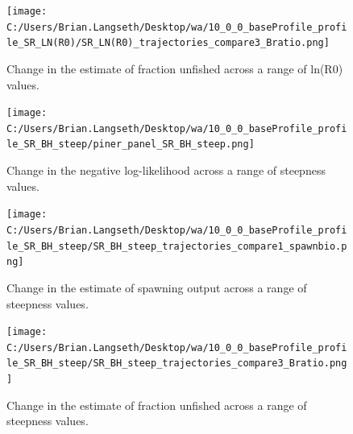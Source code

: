 \documentclass[11pt,
  english,
  letterpaper,
]{article}
\begin{document}

\begin{figure}
\centering
\texttt{[image: C:/Users/Brian.Langseth/Desktop/wa/10\_0\_0\_baseProfile\_profile\_SR\_LN(R0)/SR\_LN(R0)\_trajectories\_compare3\_Bratio.png]}
\caption{Change in the estimate of fraction unfished across a range of ln(R0) values.\label{fig:r0-depl}}
\end{figure}

\tagmcend\tagstructend


\begin{figure}
\centering
\texttt{[image: C:/Users/Brian.Langseth/Desktop/wa/10\_0\_0\_baseProfile\_profile\_SR\_BH\_steep/piner\_panel\_SR\_BH\_steep.png]}
\caption{Change in the negative log-likelihood across a range of steepness values.\label{fig:h-profile}}
\end{figure}

\tagmcend\tagstructend


\begin{figure}
\centering
\texttt{[image: C:/Users/Brian.Langseth/Desktop/wa/10\_0\_0\_baseProfile\_profile\_SR\_BH\_steep/SR\_BH\_steep\_trajectories\_compare1\_spawnbio.png]}
\caption{Change in the estimate of spawning output across a range of steepness values.\label{fig:h-ssb}}
\end{figure}

\tagmcend\tagstructend


\begin{figure}
\centering
\texttt{[image: C:/Users/Brian.Langseth/Desktop/wa/10\_0\_0\_baseProfile\_profile\_SR\_BH\_steep/SR\_BH\_steep\_trajectories\_compare3\_Bratio.png]}
\caption{Change in the estimate of fraction unfished across a range of steepness values.\label{fig:h-depl}}
\end{figure}
\end{document}
